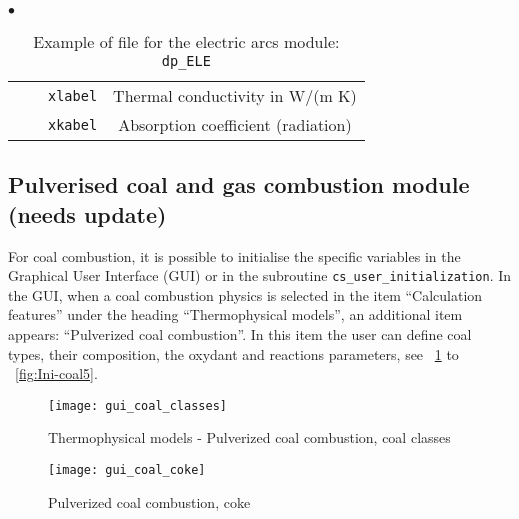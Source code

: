 {{\begin{list}{$\bullet$}{}
\begin{table}[htbp]
\begin{center}
{\begin{tabular}{|c|l|c|c|}
        &                    &    \texttt{xlabel}               & Thermal conductivity in W/(m K)                    \\
        &                    &    \texttt{xkabel\index{xkabel}} & Absorption coefficient (radiation)                 \\   \hline
\end{tabular}
}
\caption{Example of file for the electric arcs module:
 \texttt{dp\_ELE}}\label{tab:dpELE}
\end{center}
\end{table}

\end{list}

\clearpage


\subsection[Pulverised coal and gas combustion module]
{Pulverised coal and gas combustion module (needs update)}
\label{sec:Ini-coal}
For coal combustion, it is possible to initialise the specific variables in the Graphical User Interface (GUI) or in the subroutine
\texttt{cs\_user\_initialization}. In the GUI, when a coal combustion physics is selected in the item ``Calculation features'' under the heading
``Thermophysical models'', an additional item appears: ``Pulverized coal combustion''. In this item the user can define coal types, their composition, the oxydant and reactions parameters, see \figurename~\ref{fig:Ini-coal1} to \figurename~\ref{fig:Ini-coal5}.

\begin{figure}[!ht]
\begin{center}
\texttt{[image: gui\_coal\_classes]}
\caption{Thermophysical models - Pulverized coal combustion, coal classes}
\label{fig:Ini-coal1}
\end{center}
\end{figure}

\begin{figure}[!ht]
\begin{center}
\texttt{[image: gui\_coal\_coke]}
\caption{Pulverized coal combustion, coke}
\label{fig:Ini-coal2}
\end{center}
\end{figure}

}}

